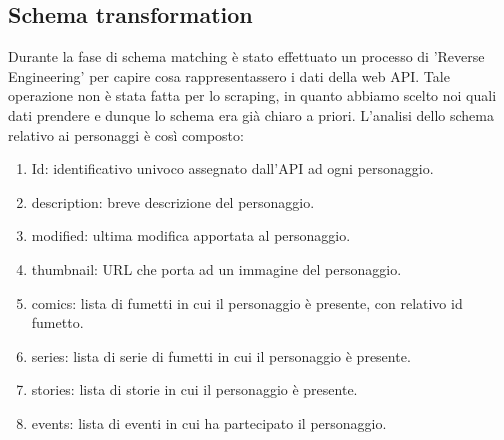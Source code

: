\documentclass[
12pt, %
a4paper, %
oneside, %
headinclude,footinclude, %
BCOR5mm, %
]{scrartcl}
\begin{document}
\subsection{Schema transformation}
Durante la fase di schema matching è stato effettuato un processo di 'Reverse Engineering' per capire cosa rappresentassero i dati della web API. Tale operazione non è stata fatta per lo scraping, in quanto abbiamo scelto noi quali dati prendere e dunque lo schema era già chiaro a priori.
L'analisi dello schema relativo ai personaggi è così composto:

\begin{enumerate}
	\item Id: identificativo univoco assegnato dall'API ad ogni personaggio.
	\item description: breve descrizione del personaggio.
	\item modified: ultima modifica apportata al personaggio.
	\item thumbnail: URL che porta ad un immagine del personaggio.
	\item comics: lista di fumetti in cui il personaggio è presente, con relativo id fumetto.
	\item series: lista di serie di fumetti in cui il personaggio è presente.
	\item stories: lista di storie in cui il personaggio è presente.
	\item events: lista di eventi in cui ha partecipato il personaggio.
\end{enumerate}
\end{document}

